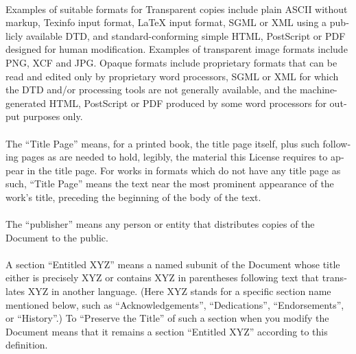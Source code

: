\documentclass[11pt,a5paper,twoside]{book}
\begin{document}
\begin{english}
\paragraph{}Examples of suitable formats for Transparent copies include plain
ASCII without markup, Texinfo input format, \LaTeX{} input format, SGML
or XML using a publicly available DTD, and standard-conforming simple
HTML, PostScript or PDF designed for human modification.  Examples of
transparent image formats include PNG, XCF and JPG.  Opaque formats
include proprietary formats that can be read and edited only by
proprietary word processors, SGML or XML for which the DTD and/or
processing tools are not generally available, and the
machine-generated HTML, PostScript or PDF produced by some word
processors for output purposes only.
\paragraph{}The “Title Page” means, for a printed book, the title page itself,
plus such following pages as are needed to hold, legibly, the material
this License requires to appear in the title page.  For works in
formats which do not have any title page as such, “Title Page” means
the text near the most prominent appearance of the work’s title,
preceding the beginning of the body of the text.
\paragraph{}The “publisher” means any person or entity that distributes copies of
the Document to the public.
\paragraph{}A section “Entitled XYZ” means a named subunit of the Document whose
title either is precisely XYZ or contains XYZ in parentheses following
text that translates XYZ in another language.  (Here XYZ stands for a
specific section name mentioned below, such as “Acknowledgements”,
“Dedications”, “Endorsements”, or “History”.)  To “Preserve the Title”
of such a section when you modify the Document means that it remains a
section “Entitled XYZ” according to this definition.

\end{english}
\end{document}
